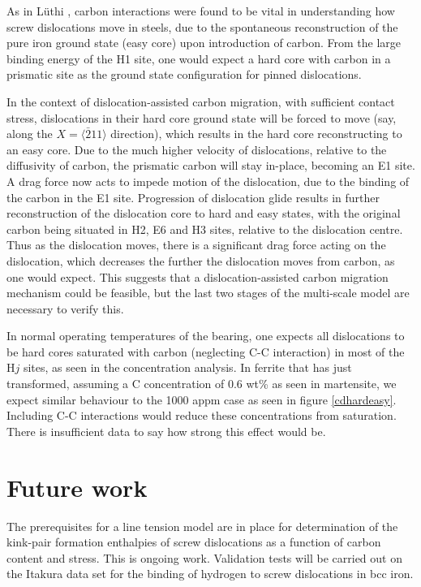 \documentclass[a4paper,11pt]{article}
\begin{document}
As in Lüthi \cite{Lthi2019}, carbon interactions were found to be vital in understanding how screw
dislocations move in steels, due to the spontaneous reconstruction of the pure iron ground state
(easy core) upon introduction of carbon. From the large binding energy of the H1 site, one would
expect a hard core with carbon in a prismatic site as the ground state configuration for pinned
dislocations.

In the context of dislocation-assisted carbon migration, with sufficient contact stress,
dislocations in their hard core ground state will be forced to move (say, along the \(X =
    \langle\bar{2}11\rangle\) direction), which results in the hard core reconstructing to an easy core. Due to
the much higher velocity of dislocations, relative to the diffusivity of carbon, the
prismatic carbon will stay in-place, becoming an E1 site. A drag force now acts to impede motion of the
dislocation, due to the binding of the carbon in the E1 site. Progression of dislocation glide
results in further reconstruction of the dislocation core to hard and easy states, with the
original carbon being situated in H2, E6 and H3 sites, relative to the dislocation
centre. Thus as the dislocation moves, there is a significant drag force acting on the
dislocation, which decreases the further the dislocation moves from carbon, as one would
expect. This suggests that a dislocation-assisted carbon migration mechanism could be feasible,
but the last two stages of the multi-scale model are necessary to verify this.


In normal operating temperatures of the bearing, one expects all dislocations to be hard cores
saturated with carbon (neglecting C-C interaction) in most of the \(\text{H}j\) sites, as seen in
the concentration analysis. In ferrite that has just transformed, assuming a C concentration of
0.6 wt\% as seen in martensite, we expect similar behaviour to the 1000 appm case as seen in
figure \ref{cdhardeasy}. Including C-C interactions would reduce these concentrations from
saturation. There is insufficient data to say how strong this effect would be.



\section{Future work}
\label{sec:org1953986}

The prerequisites for a line tension model are in place for determination of the kink-pair
formation enthalpies of screw dislocations as a function of carbon content and stress. This is
ongoing work. Validation tests will be carried out on the Itakura data set for the binding of
hydrogen to screw dislocations in bcc iron.
\end{document}
